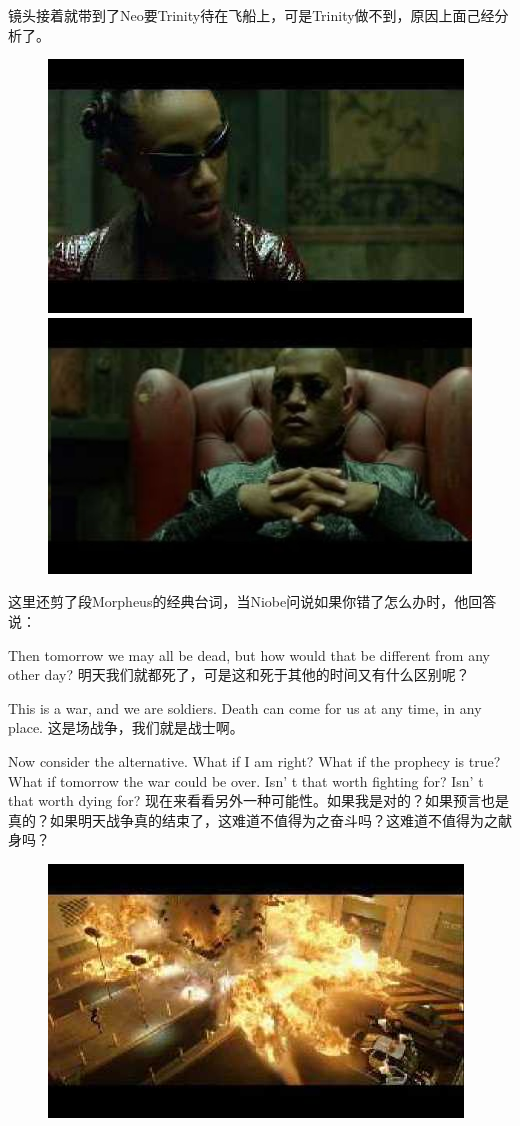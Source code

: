 \documentclass[UTF8]{ctexart}
\begin{document}
镜头接着就带到了Neo要Trinity待在飞船上，可是Trinity做不到，原因上面己经分析了。

\begin{figure}[htb]
\centering
\includegraphics[width=0.45\linewidth]{fig/read_reloaded-149}
\includegraphics[width=0.45\linewidth]{fig/read_reloaded-149-1}
\end{figure}

这里还剪了段Morpheus的经典台词，当Niobe问说如果你错了怎么办时，他回答说：

Then tomorrow we may all be dead, but how would that be different from any other day? 明天我们就都死了，可是这和死于其他的时间又有什么区别呢？

This is a war, and we are soldiers. Death can come for us at any time, in any place. 这是场战争，我们就是战士啊。

Now consider the alternative. What if I am right? What if the prophecy is true? What if tomorrow the war could be over. Isn' t that worth fighting for? Isn' t that worth dying for? 现在来看看另外一种可能性。如果我是对的？如果预言也是真的？如果明天战争真的结束了，这难道不值得为之奋斗吗？这难道不值得为之献身吗？

\begin{figure}[htb]
\centering
\includegraphics[width=0.5\linewidth]{fig/read_reloaded-150}
\end{figure}
\end{document}
